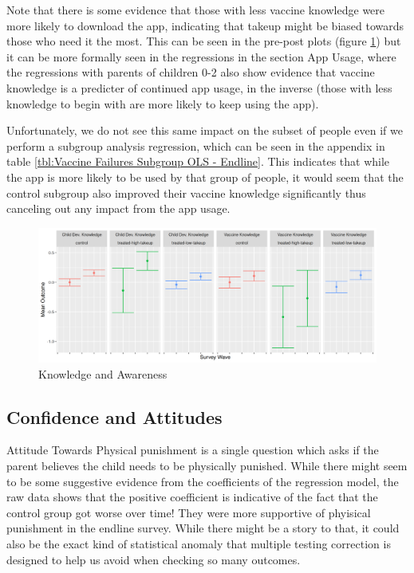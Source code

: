 \documentclass{article}
\begin{document}
Note that there is some evidence that those with less vaccine knowledge were more likely to download the app, indicating that takeup might be biased towards those who need it the most. This can be seen in the pre-post plots (figure \ref{fig:knowledge-pre-post}) but it can be more formally seen in the regressions in the section App Usage, where the regressions with parents of children 0-2 also show evidence that vaccine knowledge is a predicter of continued app usage, in the inverse (those with less knowledge to begin with are more likely to keep using the app).

Unfortunately, we do not see this same impact on the subset of people even if we perform a subgroup analysis regression, which can be seen in the appendix in table \ref{tbl:Vaccine Failures Subgroup OLS - Endline}. This indicates that while the app is more likely to be used by that group of people, it would seem that the control subgroup also improved their vaccine knowledge significantly thus canceling out any impact from the app usage.


\begin{figure}[H]
  \centering
\includegraphics[width=\textwidth]{plots/pre_post/Pooled: Vaccine Knowledge.png}
\caption{Knowledge and Awareness}
\label{fig:knowledge-pre-post}
\end{figure}


\subsection*{Confidence and Attitudes}

Attitude Towards Physical punishment is a single question which asks if the parent believes the child needs to be physically punished. While there might seem to be some suggestive evidence from the coefficients of the regression model, the raw data shows that the positive coefficient is indicative of the fact that the control group got worse over time! They were more supportive of phyisical punishment in the endline survey. While there might be a story to that, it could also be the exact kind of statistical anomaly that multiple testing correction is designed to help us avoid when checking so many outcomes.
\end{document}
